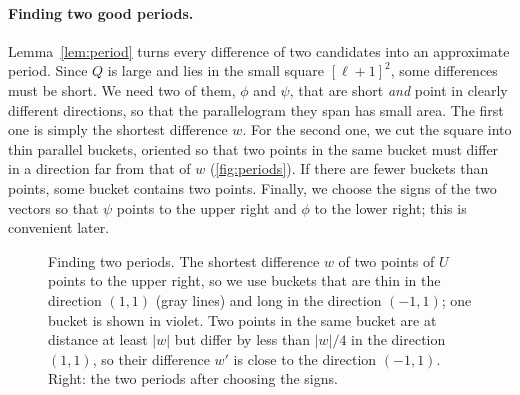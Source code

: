 \documentclass[11pt]{article}
\theoremstyle{definition}
\begin{document}
\paragraph{Finding two good periods.}
Lemma~\ref{lem:period} turns every difference of two candidates into an approximate period.
Since $Q$ is large and lies in the small square $[\ell+1]^2$, some differences must be short.
We need two of them, $\phi$ and $\psi$, that are short \emph{and} point in clearly different directions, so that the parallelogram they span has small area.
The first one is simply the shortest difference $w$.
For the second one, we cut the square into thin parallel buckets, oriented so that two points in the same bucket must differ in a direction far from that of $w$ (\autoref{fig:periods}).
If there are fewer buckets than points, some bucket contains two points.
Finally, we choose the signs of the two vectors so that $\psi$ points to the upper right and $\phi$ to the lower right; this is convenient later.

\begin{figure}[t]
  \centering
  \caption{Finding two periods.
    The shortest difference $w$ of two points of $U$ points to the upper right, so we use buckets that are thin in the direction $(1,1)$ (gray lines) and long in the direction $(-1,1)$; one bucket is shown in violet.
    Two points in the same bucket are at distance at least $|w|$ but differ by less than $|w|/4$ in the direction $(1,1)$, so their difference $w'$ is close to the direction $(-1,1)$.
    Right: the two periods after choosing the signs.}
  \label{fig:periods}
\end{figure}
\end{document}
